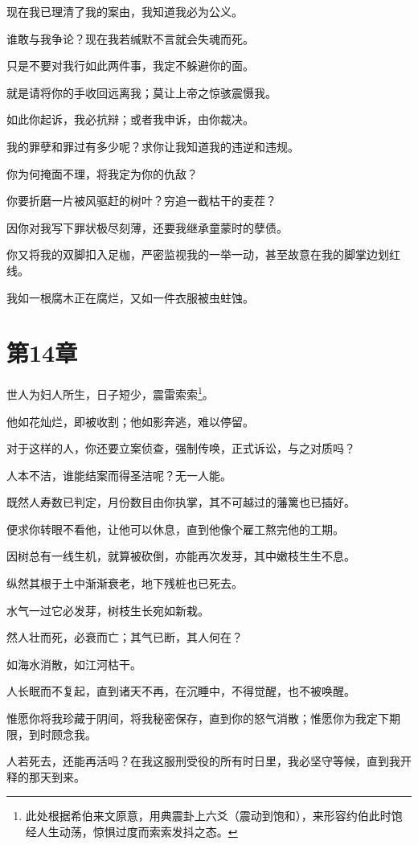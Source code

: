 \documentclass[12pt,oneside]{book}
\begin{document}
现在我已理清了我的案由，我知道我必为公义。

谁敢与我争论？现在我若缄默不言就会失魂而死。

只是不要对我行如此两件事，我定不躲避你的面。

就是请将你的手收回远离我；莫让上帝之惊骇震慑我。

如此你起诉，我必抗辩；或者我申诉，由你裁决。

我的罪孽和罪过有多少呢？求你让我知道我的违逆和违规。

你为何掩面不理，将我定为你的仇敌？

你要折磨一片被风驱赶的树叶？穷追一截枯干的麦茬？

因你对我写下罪状极尽刻薄，还要我继承童蒙时的孽债。

你又将我的双脚扣入足枷，严密监视我的一举一动，甚至故意在我的脚掌边划红线。

我如一根腐木正在腐烂，又如一件衣服被虫蛀蚀。


\chapter{第14章}
世人为妇人所生，日子短少，震雷索索\footnote{此处根据希伯来文原意，用典震卦上六爻（震动到饱和），来形容约伯此时饱经人生动荡，惊惧过度而索索发抖之态。}。

他如花灿烂，即被收割；他如影奔逃，难以停留。

对于这样的人，你还要立案侦查，强制传唤，正式诉讼，与之对质吗？

人本不洁，谁能结案而得圣洁呢？无一人能。

既然人寿数已判定，月份数目由你执掌，其不可越过的藩篱也已插好。

便求你转眼不看他，让他可以休息，直到他像个雇工熬完他的工期。

因树总有一线生机，就算被砍倒，亦能再次发芽，其中嫩枝生生不息。

纵然其根于土中渐渐衰老，地下残桩也已死去。

水气一过它必发芽，树枝生长宛如新栽。

然人壮而死，必衰而亡；其气已断，其人何在？

如海水消散，如江河枯干。

人长眠而不复起，直到诸天不再，在沉睡中，不得觉醒，也不被唤醒。

惟愿你将我珍藏于阴间，将我秘密保存，直到你的怒气消散；惟愿你为我定下期限，到时顾念我。

人若死去，还能再活吗？在我这服刑受役的所有时日里，我必坚守等候，直到我开释的那天到来。
\end{document}
